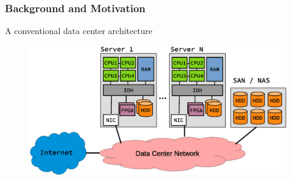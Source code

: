 










\begin{frame}
\frametitle{Background and Motivation}
A conventional data center architecture
\begin{figure}
	\centering
\includegraphics[scale=0.5]{./background/dc_architectures_conventional.eps}

\end{figure}

\end{frame}


